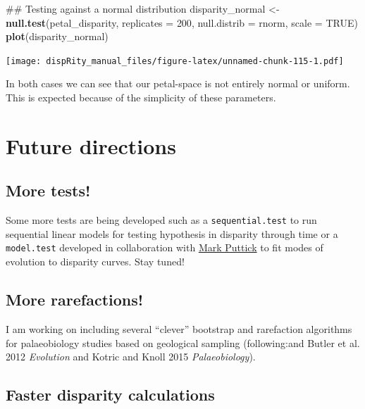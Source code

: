 \documentclass[]{book}
\newenvironment{Shaded}{\begin{snugshade}}{\end{snugshade}}
\newcommand{\KeywordTok}[1]{\textcolor[rgb]{0.13,0.29,0.53}{\textbf{#1}}}
\newcommand{\DataTypeTok}[1]{\textcolor[rgb]{0.13,0.29,0.53}{#1}}
\newcommand{\DecValTok}[1]{\textcolor[rgb]{0.00,0.00,0.81}{#1}}
\newcommand{\StringTok}[1]{\textcolor[rgb]{0.31,0.60,0.02}{#1}}
\newcommand{\OtherTok}[1]{\textcolor[rgb]{0.56,0.35,0.01}{#1}}
\newcommand{\NormalTok}[1]{#1}
\theoremstyle{definition}
\theoremstyle{definition}
\theoremstyle{remark}
\begin{document}
\begin{Shaded}
\begin{Highlighting}[]
\NormalTok{## Testing against a normal distribution}
\NormalTok{disparity_normal <-}\StringTok{ }\KeywordTok{null.test}\NormalTok{(petal_disparity, }\DataTypeTok{replicates =} \DecValTok{200}\NormalTok{,}
    \DataTypeTok{null.distrib =}\NormalTok{ rnorm, }\DataTypeTok{scale =} \OtherTok{TRUE}\NormalTok{)}
\KeywordTok{plot}\NormalTok{(disparity_normal)}
\end{Highlighting}
\end{Shaded}

\texttt{[image: dispRity\_manual\_files/figure-latex/unnamed-chunk-115-1.pdf]}

In both cases we can see that our petal-space is not entirely normal or
uniform. This is expected because of the simplicity of these parameters.

\chapter{Future directions}\label{future-directions}

\section{More tests!}\label{more-tests}

Some more tests are being developed such as a \texttt{sequential.test}
to run sequential linear models for testing hypothesis in disparity
through time or a \texttt{model.test} developed in collaboration with
\href{https://puttickbiology.wordpress.com/}{Mark Puttick} to fit modes
of evolution to disparity curves. Stay tuned!

\section{More rarefactions!}\label{more-rarefactions}

I am working on including several ``clever'' bootstrap and rarefaction
algorithms for palaeobiology studies based on geological sampling
(following:and Butler et al. 2012 \emph{Evolution} and Kotric and Knoll
2015 \emph{Palaeobiology}).

\section{Faster disparity
calculations}\label{faster-disparity-calculations}
\end{document}
